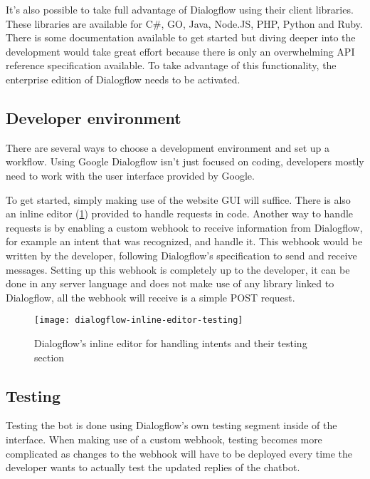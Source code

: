 It's also possible to take full advantage of Dialogflow using their client libraries. These libraries are available for C\#, GO, Java, Node.JS, PHP, Python and Ruby. There is some documentation available to get started but diving deeper into the development would take great effort because there is only an overwhelming API reference specification available. To take advantage of this functionality, the enterprise edition of Dialogflow needs to be activated.

\subsection{Developer environment}

There are several ways to choose a development environment and set up a workflow. Using Google Dialogflow isn't just focused on coding, developers mostly need to work with the user interface provided by Google.

To get started, simply making use of the website GUI will suffice. There is also an inline editor (\ref{fig:dialogflow-inline-editor-testing}) provided to handle requests in code. Another way to handle requests is by enabling a custom webhook to receive information from Dialogflow, for example an intent that was recognized, and handle it. This webhook would be written by the developer, following Dialogflow's specification to send and receive messages. Setting up this webhook is completely up to the developer, it can be done in any server language and does not make use of any library linked to Dialogflow, all the webhook will receive is a simple POST request.

\begin{figure}[ht]
	\centering
	\texttt{[image: dialogflow-inline-editor-testing]}
	\caption{Dialogflow's inline editor for handling intents and their testing section}
	\label{fig:dialogflow-inline-editor-testing}
\end{figure}


\subsection{Testing}

Testing the bot is done using Dialogflow's own testing segment inside of the interface. When making use of a custom webhook, testing becomes more complicated as changes to the webhook will have to be deployed every time the developer wants to actually test the updated replies of the chatbot.

